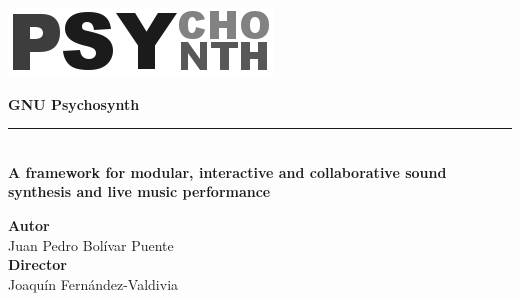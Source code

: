 
\begin{titlepage}
  
  \setlength{\centeroffset}{-0.5\oddsidemargin}
  \addtolength{\centeroffset}{0.5\evensidemargin}
  \thispagestyle{empty}


  \begin{minipage}{\textwidth}
    \centering
    \vspace{3.3cm}

    \includegraphics[width=.5\textwidth]{pic/logo-psynth.png} 
    \vspace{0.5cm}

    {\Huge\bfseries\sffamily GNU Psychosynth\\}
    \noindent\rule[-1ex]{\textwidth}{3pt}\\[3.5ex]
    {\large\bfseries A framework for modular,
      interactive and collaborative sound synthesis and live music
      performance\\[4cm]}
  \end{minipage}

  \vspace{2.5cm}
  
  \begin{minipage}{\textwidth}
    \centering

    \textbf{Autor}\\ {Juan Pedro Bolívar Puente}\\[2.5ex]
    \textbf{Director}\\
    {Joaquín Fernández-Valdivia}\\[2cm]

  \end{minipage}

\end{titlepage}

